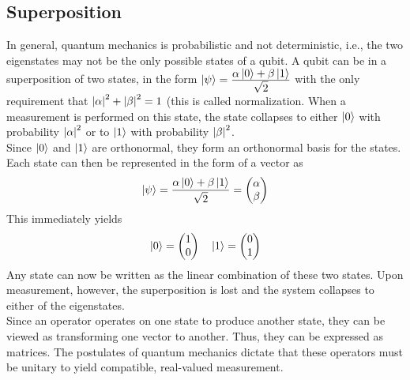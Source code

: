 \subsection{Superposition}
In general, quantum mechanics is probabilistic and not deterministic, i.e., the two eigenstates may not be the only possible states of a qubit. A qubit can be in a superposition of two states, in the form $\left\vert \psi\right\rangle=\frac{\displaystyle \alpha\left\vert 0\right\rangle+\beta\left\vert 1\right\rangle}{\displaystyle \sqrt{2}}$ with the only requirement that $\left\lvert \alpha\right\rvert^2+\left\lvert \beta\right\rvert^2=1$ (this is called normalization. When a measurement is performed on this state, the state collapses to either $\left\vert 0\right\rangle$ with probability $\left\lvert \alpha\right\rvert^2$ or to $\left\vert 1\right\rangle$ with probability $\left\lvert \beta\right\rvert^2$.\\
Since $\left\vert 0\right\rangle$ and $\left\vert 1\right\rangle$ are orthonormal, they form an orthonormal basis for the states. Each state can then be represented in the form of a vector as
\begin{equation}
\label{eq:4.1}
\left\vert \psi\right\rangle=\frac{\displaystyle \alpha\left\vert 0\right\rangle+\beta\left\vert 1\right\rangle}{\displaystyle \sqrt{2}}=
\begin{pmatrix}
\alpha\\
\beta
\end{pmatrix}
\end{equation}
This immediately yields
\begin{equation*}
\left\vert 0\right\rangle=
\begin{pmatrix}
1\\
0
\end{pmatrix}\quad
\left\vert 1\right\rangle=
\begin{pmatrix}
0\\
1
\end{pmatrix}
\end{equation*}
Any state can now be written as the linear combination of these two states. Upon measurement, however, the superposition is lost and the system collapses to either of the eigenstates.\\
Since an operator operates on one state to produce another state, they can be viewed as transforming one vector to another. Thus, they can be expressed as matrices. The postulates of quantum mechanics dictate that these operators must be unitary to yield compatible, real-valued measurement.
